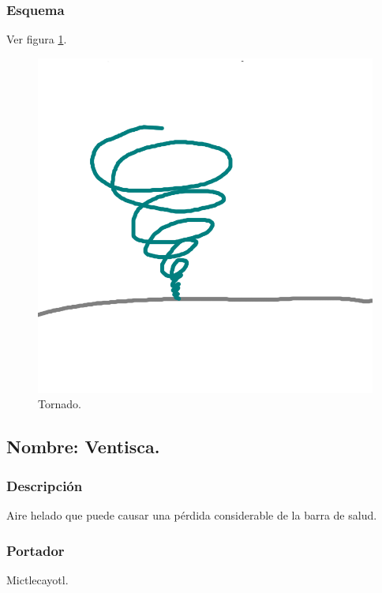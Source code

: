 \documentclass[11pt,letterpaper]{article}
\begin{document}
\subsubsection{Esquema}
			Ver figura \ref{fig:tornado}.
			\begin{figure}
				\centering
				\includegraphics[height=0.2 \textheight]{Imagenes/tornado}
				\caption{Tornado.}
				\label{fig:tornado}
			\end{figure}
\subsection{Nombre: Ventisca.}
\subsubsection{Descripción}
Aire helado que puede causar una pérdida considerable de la barra de salud.
\subsubsection{Portador}
Mictlecayotl.
\end{document}
